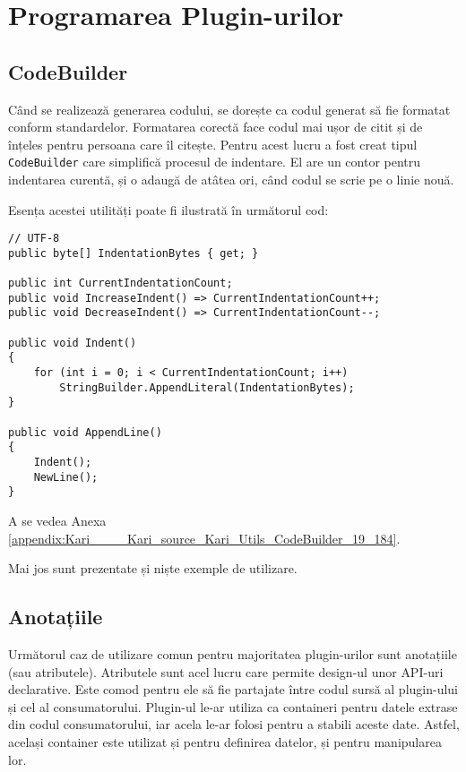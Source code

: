\documentclass[a4paper,12pt]{report}
\begin{document}
\section{Programarea Plugin-urilor}

\subsection{CodeBuilder}

Când se realizează generarea codului, se dorește ca codul generat să fie formatat conform standardelor.
Formatarea corectă face codul mai ușor de citit și de înțeles pentru persoana care îl citește.
Pentru acest lucru a fost creat tipul \texttt{CodeBuilder} care simplifică procesul de indentare.
El are un contor pentru indentarea curentă, și o adaugă de atâtea ori, când codul se scrie pe o linie nouă.

Esența acestei utilități poate fi ilustrată în următorul cod:

\begin{verbatim}
// UTF-8
public byte[] IndentationBytes { get; }

public int CurrentIndentationCount;
public void IncreaseIndent() => CurrentIndentationCount++;
public void DecreaseIndent() => CurrentIndentationCount--;

public void Indent()
{
    for (int i = 0; i < CurrentIndentationCount; i++)
        StringBuilder.AppendLiteral(IndentationBytes);
}

public void AppendLine()
{
    Indent();
    NewLine();
}
\end{verbatim}

A se vedea Anexa \ref{appendix:Kari____Kari_source_Kari_Utils_CodeBuilder_19_184}.

Mai jos sunt prezentate și niște exemple de utilizare.

\subsection{Anotațiile}

Următorul caz de utilizare comun pentru majoritatea plugin-urilor sunt anotațiile (sau atributele).
Atributele sunt acel lucru care permite design-ul unor \ac{API}-uri declarative.
Este comod pentru ele să fie partajate între codul sursă al plugin-ului și cel al consumatorului.
Plugin-ul le-ar utiliza ca containeri pentru datele extrase din codul consumatorului, iar acela le-ar folosi pentru a stabili aceste date.
Astfel, același container este utilizat și pentru definirea datelor, și pentru manipularea lor.
\end{document}
